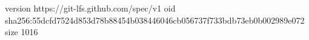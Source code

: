 version https://git-lfs.github.com/spec/v1
oid sha256:55dcfd7524d853d78b88454b038446046cb056737f733bdb73eb0b002989e072
size 1016
